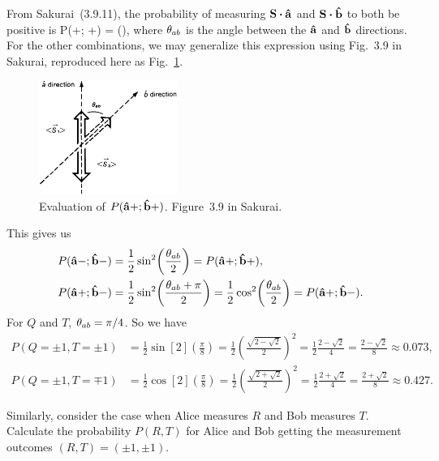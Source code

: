 \begin{solution}
	From Sakurai~(3.9.11), the probability of measuring $\vS \vdot \ah$ and $\vS \vdot \bh$ to both be positive is
	\beq
		P(\ah+; \bh+) =  \sin[2](),
	\eeq
	where $\theta_{ab}$ is the angle between the $\vb{\hat{a}}$ and $\vb{\hat{b}}$ directions.  For the other combinations, we may generalize this expression using Fig.~3.9 in Sakurai, reproduced here as Fig.~\ref{sakurai}.
	
	\begin{figure} \centering
		\includegraphics[width=0.4\textwidth]{3-9.jpg}
		\caption{Evaluation of $P(\vb{\hat{a}}+; \vb{\hat{b}}+)$.  Figure~3.9 in Sakurai.}
		\label{sakurai}
	\end{figure}

	This gives us
	\begin{align}
		P(\vb{\hat{a}}-; \vb{\hat{b}}-) &= \frac{1}{2} \sin[2](\frac{\theta_{ab}}{2}) = P(\vb{\hat{a}}+; \vb{\hat{b}}+), \label{prob1} \\
		P(\vb{\hat{a}}+; \vb{\hat{b}}-) &= \frac{1}{2} \sin[2](\frac{\theta_{ab} + \pi}{2}) = \frac{1}{2} \cos[2](\frac{\theta_{ab}}{2}) = P(\vb{\hat{a}}+; \vb{\hat{b}}-). \label{prob2}
	\end{align}
	For $Q$ and $T$, $\theta_{ab} = \pi / 4$.  So we have
	\begin{align*}
		P(Q=\pm1, T=\pm1) &= \frac{1}{2} \sin[2](\frac{\pi}{8})
		= \frac{1}{2} \left( \frac{\sqrt{2 - \sqrt{2}}}{2} \right)^2
		= \frac{1}{2} \frac{2 - \sqrt{2}}{4}
		= \frac{2 - \sqrt{2}}{8}
		\approx 0.073, \\
		P(Q=\pm1, T=\mp1) &= \frac{1}{2} \cos[2](\frac{\pi}{8})
		= \frac{1}{2} \left( \frac{\sqrt{2 + \sqrt{2}}}{2} \right)^2
		= \frac{1}{2} \frac{2 + \sqrt{2}}{4}
		= \frac{2 + \sqrt{2}}{8}
		\approx 0.427.
	\end{align*}
	\vfix
\end{solution}
\vspace{-2\baselineskip}


\newcommand{\kRp}{\ket{R_+}}
\newcommand{\kRm}{\ket{R_-}}
\newcommand{\kSp}{\ket{S_+}}
\newcommand{\kSm}{\ket{S_-}}

\begin{problem}
	Similarly, consider the case when Alice measures $R$ and Bob measures $T$.  Calculate the probability $P(R, T)$ for Alice and Bob getting the measurement outcomes $(R, T) = (\pm1, \pm1)$.
\end{problem}

